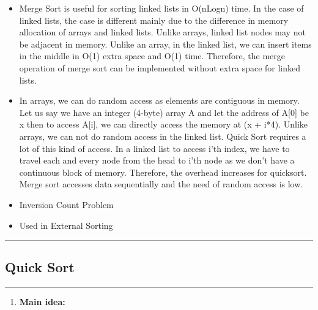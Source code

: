 \documentclass[11pt,a4paper]{article}
\begin{document}
{\begin{enumerate}[label=\textbf{\arabic*})]
\begin{itemize}
						\item Merge Sort is useful for sorting linked lists in O(nLogn) time. In the case of linked lists, the case is different mainly due to the difference in memory allocation of arrays and linked lists. Unlike arrays, linked list nodes may not be adjacent in memory. Unlike an array, in the linked list, we can insert items in the middle in O(1) extra space and O(1) time. Therefore, the merge operation of merge sort can be implemented without extra space for linked lists.
						\item In arrays, we can do random access as elements are contiguous in memory. Let us say we have an integer (4-byte) array A and let the address of A[0] be x then to access A[i], we can directly access the memory at (x + i*4). Unlike arrays, we can not do random access in the linked list. Quick Sort requires a lot of this kind of access. In a linked list to access i’th index, we have to travel each and every node from the head to i’th node as we don’t have a continuous block of memory. Therefore, the overhead increases for quicksort. Merge sort accesses data sequentially and the need of random access is low.
						\item Inversion Count Problem
						\item Used in External Sorting
					\end{itemize}
			\end{enumerate}
		
		\rule{15cm}{0.1cm}
		\subsection{Quick Sort}
		\rule{15cm}{0.1cm}
			\begin{enumerate}[label=\textbf{\arabic*})]
				\item \textbf{Main idea:}
				

\end{enumerate}}
\end{document}

